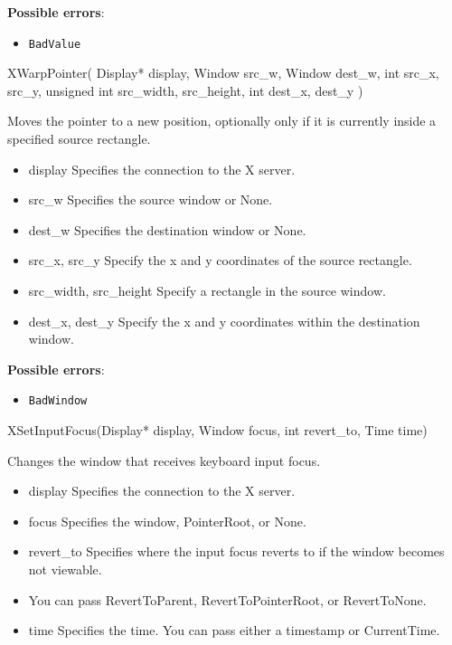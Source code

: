 \documentclass{report}
\begin{document}
\begin{itemize}
        \textbf{Possible errors}:
        \begin{itemize}
            \item \texttt{BadValue}
        \end{itemize}

        \begin{cppcode}
            XWarpPointer(
                Display* display,
                Window src_w,
                Window dest_w,
                int src_x, src_y,
                unsigned int src_width, src_height,
                int dest_x, dest_y
            )
        \end{cppcode}
        \bigbreak \noindent
        Moves the pointer to a new position, optionally only if it is currently inside a specified source rectangle.

        \begin{itemize}
            \item display Specifies the connection to the X server.
            \item src\_w Specifies the source window or None.
            \item dest\_w Specifies the destination window or None.
            \item src\_x, src\_y Specify the x and y coordinates of the source rectangle.
            \item src\_width, src\_height Specify a rectangle in the source window.
            \item dest\_x, dest\_y Specify the x and y coordinates within the destination window.
        \end{itemize}

        \textbf{Possible errors}:
        \begin{itemize}
            \item \texttt{BadWindow}
        \end{itemize}

        \begin{cppcode}
        XSetInputFocus(Display* display, Window focus, int revert_to, Time time)
        \end{cppcode}
        \bigbreak \noindent
        Changes the window that receives keyboard input focus.

        \begin{itemize}
            \item display Specifies the connection to the X server.
            \item focus Specifies the window, PointerRoot, or None.
            \item revert\_to Specifies where the input focus reverts to if the window becomes not viewable.
            \item You can pass RevertToParent, RevertToPointerRoot, or RevertToNone.
            \item time Specifies the time. You can pass either a timestamp or CurrentTime.
        \end{itemize}


\end{itemize}
\end{document}
